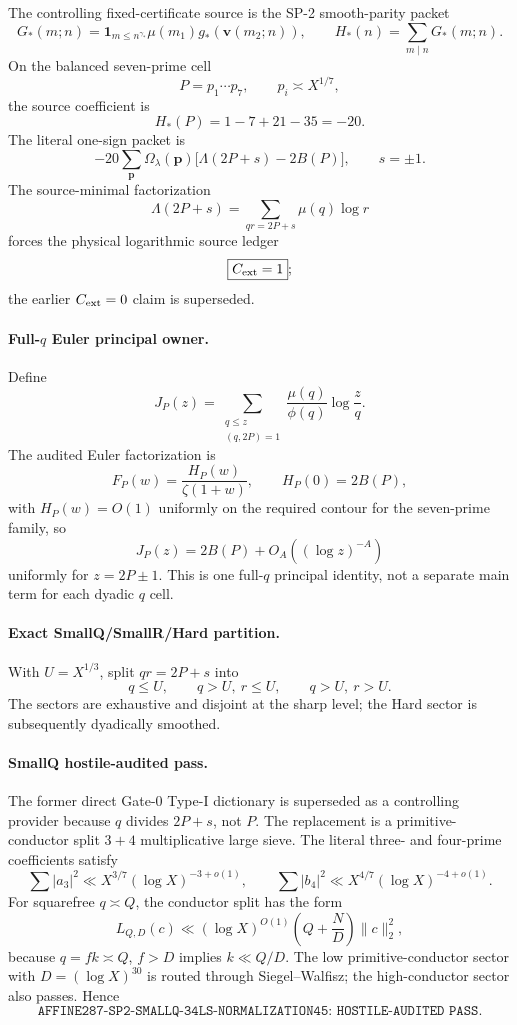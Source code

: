 \documentclass[11pt]{article}
\theoremstyle{definition}
\newcommand{\1}{\mathbf 1}
\begin{document}
The controlling fixed-certificate source is the SP-2 smooth-parity packet
\[
G_*(m;n)=
\mathbf1_{m\le n^{\gamma_*}}\mu(m_1)g_*(\mathbf v(m_2;n)),
\qquad
H_*(n)=\sum_{m\mid n}G_*(m;n).
\]
On the balanced seven-prime cell
\[
P=p_1\cdots p_7,\qquad p_i\asymp X^{1/7},
\]
the source coefficient is
\[
\boxed{H_*(P)=1-7+21-35=-20}.
\]
The literal one-sign packet is
\[
-20\sum_{\mathbf p}\Omega_\lambda(\mathbf p)
\bigl[\Lambda(2P+s)-2B(P)\bigr],
\qquad s=\pm1.
\]
The source-minimal factorization
\[
\Lambda(2P+s)=\sum_{qr=2P+s}\mu(q)\log r
\]
forces the physical logarithmic source ledger
\[
\boxed{C_{\rm ext}=1};
\]
the earlier $C_{\rm ext}=0$ claim is superseded.

\paragraph{Full-$q$ Euler principal owner.}
Define
\[
J_P(z)=
\sum_{\substack{q\le z\\(q,2P)=1}}
\frac{\mu(q)}{\phi(q)}
\log\frac zq.
\]
The audited Euler factorization is
\[
F_P(w)=\frac{H_P(w)}{\zeta(1+w)},
\qquad
H_P(0)=2B(P),
\]
with $H_P(w)=O(1)$ uniformly on the required contour for the seven-prime family, so
\[
\boxed{
J_P(z)=2B(P)+O_A((\log z)^{-A})
}
\]
uniformly for $z=2P\pm1$.  This is one full-$q$ principal identity, not a separate main
term for each dyadic $q$ cell.

\paragraph{Exact SmallQ/SmallR/Hard partition.}
With $U=X^{1/3}$, split $qr=2P+s$ into
\[
q\le U,\qquad q>U,\ r\le U,\qquad q>U,\ r>U.
\]
The sectors are exhaustive and disjoint at the sharp level; the Hard sector is subsequently
dyadically smoothed.

\paragraph{SmallQ hostile-audited pass.}
The former direct Gate-0 Type-I dictionary is superseded as a controlling provider because
$q$ divides $2P+s$, not $P$.  The replacement is a primitive-conductor split $3+4$
multiplicative large sieve.  The literal three- and four-prime coefficients satisfy
\[
\sum|a_3|^2\ll X^{3/7}(\log X)^{-3+o(1)},
\qquad
\sum|b_4|^2\ll X^{4/7}(\log X)^{-4+o(1)}.
\]
For squarefree $q\asymp Q$, the conductor split has the form
\[
L_{Q,D}(c)\ll
(\log X)^{O(1)}
\left(Q+\frac ND\right)\|c\|_2^2,
\]
because $q=fk\asymp Q$, $f>D$ implies $k\ll Q/D$.  The low primitive-conductor sector
with $D=(\log X)^{30}$ is routed through Siegel--Walfisz; the high-conductor sector also
passes.  Hence
\[
\boxed{\texttt{AFFINE287-SP2-SMALLQ-34LS-NORMALIZATION45:
HOSTILE-AUDITED PASS}}.
\]
\end{document}

